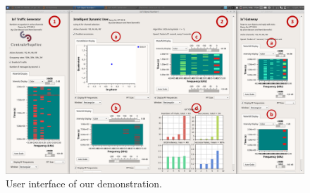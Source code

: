 \begin{figure}[!h]
    \centering
    \includegraphics[width=1.00\textwidth]{UI.eps}
    \caption{User interface of our demonstration.}
    \label{fig:42:UI}
\end{figure}


